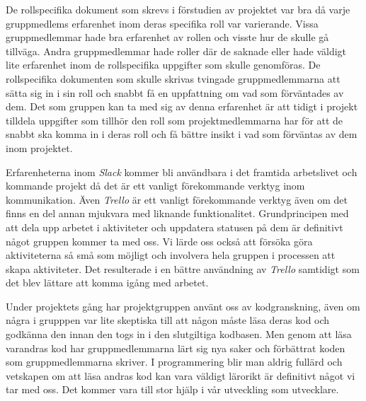 De rollspecifika dokument som skrevs i förstudien av projektet var bra då varje gruppmedlems erfarenhet inom deras specifika roll var varierande. Vissa gruppmedlemmar hade bra erfarenhet av rollen och visste hur de skulle gå tillväga. Andra gruppmedlemmar hade roller där de saknade eller hade väldigt lite erfarenhet inom de rollspecifika uppgifter som skulle genomföras. De rollspecifika dokumenten som skulle skrivas tvingade gruppmedlemmarna att sätta sig in i sin roll och snabbt få en uppfattning om vad som förväntades av dem. Det som gruppen kan ta med sig av denna erfarenhet är att tidigt i projekt tilldela uppgifter som tillhör den roll som projektmedlemmarna har för att de snabbt ska komma in i deras roll och få bättre insikt i vad som förväntas av dem inom projektet.

Erfarenheterna inom \textit{Slack} kommer bli användbara i det framtida arbetslivet och kommande projekt då det är ett vanligt förekommande verktyg inom kommunikation. Även \textit{Trello} är ett vanligt förekommande verktyg även om det finns en del annan mjukvara med liknande funktionalitet. Grundprincipen med att dela upp arbetet i aktiviteter och uppdatera statusen på dem är definitivt något gruppen kommer ta med oss. Vi lärde oss också att försöka göra aktiviteterna så små som möjligt och involvera hela gruppen i processen att skapa aktiviteter. Det resulterade i en bättre användning av \textit{Trello} samtidigt som det blev lättare att komma igång med arbetet.

Under projektets gång har projektgruppen använt oss av kodgranskning, även om några i grupppen var lite skeptiska till att någon måste läsa deras kod och godkänna den innan den togs in i den slutgiltiga kodbasen. Men genom att läsa varandras kod har gruppmedlemmarna lärt sig nya saker och förbättrat koden som gruppmedlemmarna skriver. I programmering blir man aldrig fullärd och vetskapen om att läsa andras kod kan vara väldigt lärorikt är definitivt något vi tar med oss. Det kommer vara till stor hjälp i vår utveckling som utvecklare.


